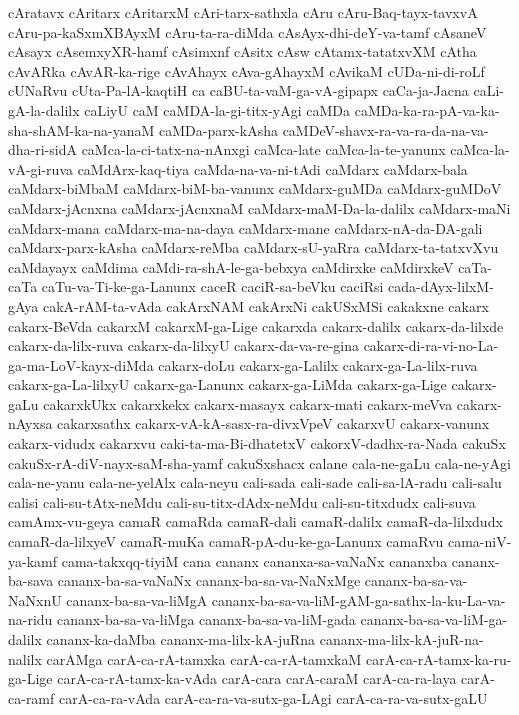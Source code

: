 {cAratavx
cAritarx
cAritarxM
cAri-tarx-sathxla
cAru
cAru-Baq-tayx-tavxvA
cAru-pa-kaSxmXBAyxM
cAru-ta-ra-diMda
cAsAyx-dhi-deY-va-tamf
cAsaneV
cAsayx
cAsemxyXR-hamf
cAsimxnf
cAsitx
cAsw
cAtamx-tatatxvXM
cAtha
cAvARka
cAvAR-ka-rige
cAvAhayx
cAva-gAhayxM
cAvikaM
cUDa-ni-di-roLf
cUNaRvu
cUta-Pa-lA-kaqtiH
ca
caBU-ta-vaM-ga-vA-gipapx
caCa-ja-Jacna
caLi-gA-la-dalilx
caLiyU
caM
caMDA-la-gi-titx-yAgi
caMDa
caMDa-ka-ra-pA-va-ka-sha-shAM-ka-na-yanaM
caMDa-parx-kAsha
caMDeV-shavx-ra-va-ra-da-na-va-dha-ri-sidA
caMca-la-ci-tatx-na-nAnxgi
caMca-late
caMca-la-te-yanunx
caMca-la-vA-gi-ruva
caMdArx-kaq-tiya
caMda-na-va-ni-tAdi
caMdarx
caMdarx-bala
caMdarx-biMbaM
caMdarx-biM-ba-vanunx
caMdarx-guMDa
caMdarx-guMDoV
caMdarx-jAcnxna
caMdarx-jAcnxnaM
caMdarx-maM-Da-la-dalilx
caMdarx-maNi
caMdarx-mana
caMdarx-ma-na-daya
caMdarx-mane
caMdarx-nA-da-DA-gali
caMdarx-parx-kAsha
caMdarx-reMba
caMdarx-sU-yaRra
caMdarx-ta-tatxvXvu
caMdayayx
caMdima
caMdi-ra-shA-le-ga-bebxya
caMdirxke
caMdirxkeV
caTa-caTa
caTu-va-Ti-ke-ga-Lanunx
caceR
caciR-sa-beVku
caciRsi
cada-dAyx-lilxM-gAya
cakA-rAM-ta-vAda
cakArxNAM
cakArxNi
cakUSxMSi
cakakxne
cakarx
cakarx-BeVda
cakarxM
cakarxM-ga-Lige
cakarxda
cakarx-dalilx
cakarx-da-lilxde
cakarx-da-lilx-ruva
cakarx-da-lilxyU
cakarx-da-va-re-gina
cakarx-di-ra-vi-no-La-ga-ma-LoV-kayx-diMda
cakarx-doLu
cakarx-ga-Lalilx
cakarx-ga-La-lilx-ruva
cakarx-ga-La-lilxyU
cakarx-ga-Lanunx
cakarx-ga-LiMda
cakarx-ga-Lige
cakarx-gaLu
cakarxkUkx
cakarxkekx
cakarx-masayx
cakarx-mati
cakarx-meVva
cakarx-nAyxsa
cakarxsathx
cakarx-vA-kA-sasx-ra-divxVpeV
cakarxvU
cakarx-vanunx
cakarx-vidudx
cakarxvu
caki-ta-ma-Bi-dhatetxV
cakorxV-dadhx-ra-Nada
cakuSx
cakuSx-rA-diV-nayx-saM-sha-yamf
cakuSxshacx
calane
cala-ne-gaLu
cala-ne-yAgi
cala-ne-yanu
cala-ne-yelAlx
cala-neyu
cali-sada
cali-sade
cali-sa-lA-radu
cali-salu
calisi
cali-su-tAtx-neMdu
cali-su-titx-dAdx-neMdu
cali-su-titxdudx
cali-suva
camAmx-vu-geya
camaR
camaRda
camaR-dali
camaR-dalilx
camaR-da-lilxdudx
camaR-da-lilxyeV
camaR-muKa
camaR-pA-du-ke-ga-Lanunx
camaRvu
cama-niV-ya-kamf
cama-takxqq-tiyiM
cana
cananx
cananxa-sa-vaNaNx
cananxba
cananx-ba-sava
cananx-ba-sa-vaNaNx
cananx-ba-sa-va-NaNxMge
cananx-ba-sa-va-NaNxnU
cananx-ba-sa-va-liMgA
cananx-ba-sa-va-liM-gAM-ga-sathx-la-ku-La-va-na-ridu
cananx-ba-sa-va-liMga
cananx-ba-sa-va-liM-gada
cananx-ba-sa-va-liM-ga-dalilx
cananx-ka-daMba
cananx-ma-lilx-kA-juRna
cananx-ma-lilx-kA-juR-na-nalilx
carAMga
carA-ca-rA-tamxka
carA-ca-rA-tamxkaM
carA-ca-rA-tamx-ka-ru-ga-Lige
carA-ca-rA-tamx-ka-vAda
carA-cara
carA-caraM
carA-ca-ra-laya
carA-ca-ramf
carA-ca-ra-vAda
carA-ca-ra-va-sutx-ga-LAgi
carA-ca-ra-va-sutx-gaLU
}
